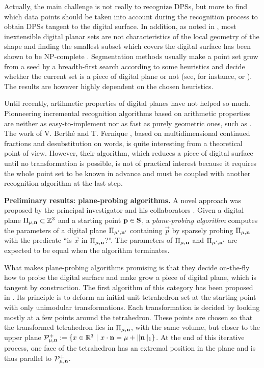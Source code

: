 Actually, the main challenge is not really to recognize DPSs, but more to find which data points
should be taken into account during the recognition process to obtain DPSs tangent to the digital
surface. In addition, as noted in \cite{Charrier2011}, most inextensible digital planar sets are not
characteristics of the local geometry of the shape and finding the smallest subset which covers
the digital surface has been shown to be NP-complete \cite{Sivignon2009}.
Segmentation methods usually make a point set grow from a seed by a breadth-first search according
to some heuristics and decide whether the current set is a piece of digital plane or not
(see, for instance, \cite{Klette2001} or \cite{Sivignon2004}). 
The results are however highly dependent on the chosen heuristics.   

Until recently, artihmetic properties of digital planes have not helped so much.
Pionneering incremental recognition algorithms based on arithmetic properties
\cite{Debled1994,Mesmoudi2002} are neither as easy-to-implement nor as fast as
purely geometric ones, such as \cite{Gerard2005}.  
The work of V. Berth\'{e} and T. Fernique \cite{Fernique2009,Berthe2011}, 
based on multidimensional continued fractions and desubstitution on words,
is quite interesting from a theoretical point of view. However, their algorithm,
which reduces a piece of digital surface until no transformation is possible,
is not of practical interest because it requires the whole point set to be known
in advance and must be coupled with another recognition algorithm at the last step.  

\noindent\textbf{Preliminary results: plane-probing algorithms.}
A novel approach was proposed by the principal investigator and his collaborators
\cite{LPRTCS2016, LPRDGCI2016, LPRJMIV2017}. 
Given a digital plane $\Pi_{\mu,\mathbf{n}} \subset {\ensuremath\mathbb{Z}}^3$
and a starting point $\mathbf{p} \in \mathbf{S}$, 
a \emph{plane-probing algorithm} computes the parameters of a digital plane $\Pi_{\mu',\mathbf{n}'}$
containing $\vec{p}$ by sparsely probing $\Pi_{\mu,\mathbf{n}}$ with the predicate
``is $\vec{x}$ in $\Pi_{\mu,\mathbf{n}}$?''. The parameters of $\Pi_{\mu,\mathbf{n}}$
and $\Pi_{\mu',\mathbf{n}'}$ are expected to be equal when the algorithm terminates.

What makes plane-probing algorithms promising is that they decide on-the-fly how
to probe the digital surface and make grow a piece of digital plane, which is
tangent by construction. 
The first algorithm of this category has been proposed in \cite{LPRTCS2016}.
Its principle is to deform an initial unit tetrahedron set at the starting point
with only unimodular transformations. Each transformation is decided by looking
mostly at a few points around the tetrahedron. These points are chosen so that
the transformed tetrahedron lies in $\Pi_{\mu,\mathbf{n}}$, with the same volume,
but closer to the upper plane
$\mathcal{P}^{+}_{\mu,\mathbf{n}} := \{ x \in {\ensuremath\mathbb{R}}^3 \ | \ x \cdot \mathbf{n} = \mu + \|\mathbf{n}\|_1 \}$.
At the end of this iterative process, one face of the tetrahedron has an extremal
position in the plane and is thus parallel to $\mathcal{P}^{+}_{\mu,\mathbf{n}}$.

